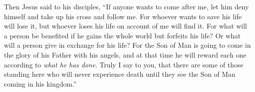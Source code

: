 \begin{biblechapter}
 Then Jesus said to his disciples, “If anyone wants to come after me, let him deny himself and take up his cross and follow me.
\verse For whoever wants to save his life will lose it, but whoever loses his life on account of me will find it.
\verse For what will a person be benefited if he gains the whole world but forfeits his life? Or what will a person give in exchange for his life?
\verse For the Son of Man is going to come in the glory of his Father with his angels, and at that time he will reward each one according to \textit{what he has done}.
\verse Truly I say to you, that there are some of those standing here who will never experience death until they see the Son of Man coming in his kingdom.”
\end{biblechapter}

